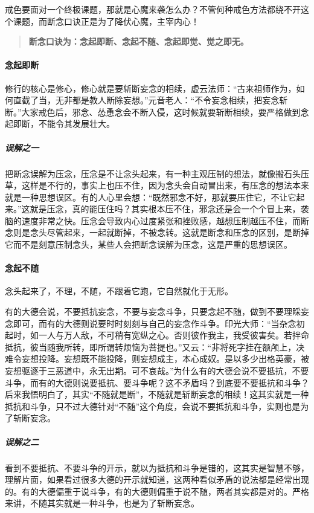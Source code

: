 戒色要面对一个终极课题，那就是心魔来袭怎么办？不管何种戒色方法都绕不开这个课题，而断念口诀正是为了降伏心魔，主宰内心！

\begin{quote}\bf
    断念口诀为：念起即断、念起不随、念起即觉、觉之即无。
\end{quote}

\paragraph{念起即断}

修行的核心是修心，修心就是要斩断妄念的相续，虚云法师：“古来祖师作为，如何直截了当，无非都是教人断除妄想。”元音老人：“不令妄念相续，把妄念斩断。”大家戒色后，邪念、怂恿念会不断入侵，这时候就要斩断相续，要严格做到念起即断，不能令其发展壮大。

\subparagraph{误解之一}

把断念误解为压念，压念是不让念头起来，有一种主观压制的想法，就像搬石头压草，这样是不行的，事实上也压不住，因为念头会自动冒出来，有压念的想法本来就是一种思想误区。有的人心里会想：“既然邪念不好，那就要压住它，不让它起来。”这就是压念，真的能压住吗？其实根本压不住，邪念还是会一个个冒上来，袭脑的速度非常之快。压念会导致内心过度紧张和挫败感，越想压制越压不住，而断念则是念头尽管起来，一起就断掉，不被念转。这就是断念和压念的区别，是断掉它而不是刻意压制念头，某些人会把断念误解为压念，这是严重的思想误区。

\paragraph{念起不随}

念头起来了，不理，不随，不跟着它跑，它自然就化于无形。

有的大德会说，不要抵抗妄念，不要与妄念斗争，只要念起不随，做到不要理睬妄念即可，而有的大德则说要时时刻刻与自己的妄念作斗争。印光大师：“当杂念初起时，如一人与万人敌，不可稍有宽纵之心。否则彼作我主，我受彼害矣。若拌命抵抗，彼当随我所转，即所谓转烦恼为菩提也。”又云：“非将死字挂在额颅上，决难令妄想投降。妄想既不能投降，则妄想成主，本心成奴。是以多少出格英豪，被妄想驱逐于三恶道中，永无出期。可不哀哉。”为什么有的大德会说不要抵抗，不要斗争，而有的大德则说要抵抗、要斗争呢？这不矛盾吗？到底要不要抵抗和斗争？后来我悟明白了，其实“不随就是断”，不随就是斩断妄念的相续！这其实就是一种抵抗和斗争，只不过大德针对“不随”这个角度，会说不要抵抗和斗争，实则也是为了斩断妄念。

\subparagraph{误解之二}

看到不要抵抗、不要斗争的开示，就以为抵抗和斗争是错的，这其实是智慧不够，理解片面，如果看过很多大德的开示就知道，这两种看似矛盾的说法都是经常出现的。有的大德偏重于说斗争，有的大德则偏重于说不随，两者其实都是对的。严格来讲，不随其实就是一种斗争，也是为了斩断妄念。

